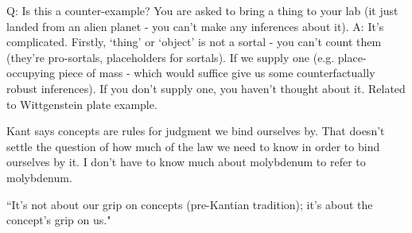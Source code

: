 Q: Is this a counter-example? You are asked to bring a thing to your lab (it just landed from an alien planet - you can't make any inferences about it).
A: It's complicated. Firstly, `thing' or `object' is not a sortal - you can't count them (they're pro-sortals, placeholders for sortals). If we supply one (e.g. place-occupying piece of mass - which would suffice give us some counterfactually robust inferences). If you don't supply one, you haven't thought about it. Related to Wittgenstein plate example.

Kant says concepts are rules for judgment we bind ourselves by. That doesn't settle the question of how much of the law we need to know in order to bind ourselves by it. I don't have to know much about molybdenum to refer to molybdenum.

``It's not about our grip on concepts (pre-Kantian tradition); it's about the concept's grip on us."


